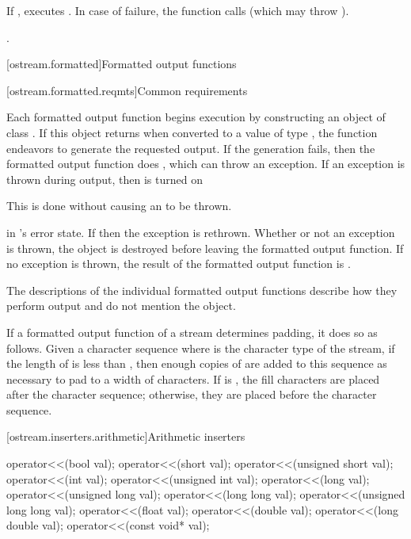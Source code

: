 \begin{itemdescr}
\pnum
\effects
If
,
executes
.
In case of failure, the function calls 
(which may throw ).

\pnum
\returns
{}.
\end{itemdescr}

[ostream.formatted]{Formatted output functions}

[ostream.formatted.reqmts]{Common requirements}

\pnum
Each formatted output function begins execution by constructing an object of class
.
If this object returns
when converted to a value of type
,
the function endeavors
to generate the requested output.
If the generation fails, then the formatted output function does
,
which can throw an exception.
If an exception is thrown during output, then
is turned on
\begin{footnote}
This is done without causing an
to be thrown.
\end{footnote}
in
's
error state.
If
then the exception is rethrown.
Whether or not an exception is thrown, the
object is destroyed before leaving the formatted output function.
If no exception is thrown, the result of the formatted output function
is
.

\pnum
The descriptions of the individual formatted output functions
describe how they perform
output and do not mention the
object.

\pnum
If a formatted output function of a stream  determines
padding, it does so as
follows. Given a  character sequence  where
 is the character type of the stream, if
the length of  is less than , then enough copies of
 are added to this sequence as necessary to pad to a
width of  characters. If
 is
, the fill characters are placed
after the character sequence; otherwise, they are placed before the
character sequence.

[ostream.inserters.arithmetic]{Arithmetic inserters}

%
\begin{itemdecl}
operator<<(bool val);
operator<<(short val);
operator<<(unsigned short val);
operator<<(int val);
operator<<(unsigned int val);
operator<<(long val);
operator<<(unsigned long val);
operator<<(long long val);
operator<<(unsigned long long val);
operator<<(float val);
operator<<(double val);
operator<<(long double val);
operator<<(const void* val);
\end{itemdecl}

